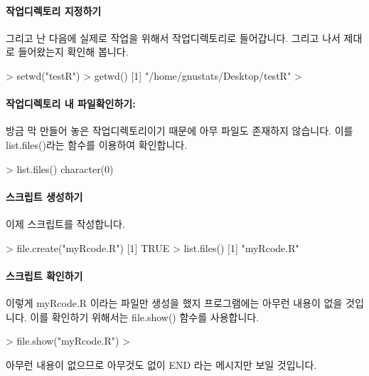 \documentclass[tutorial.tex]{subfiles}
\begin{document}
\paragraph{작업디렉토리 지정하기}
그리고 난 다음에 실제로 작업을 위해서 작업디렉토리로 들어갑니다. 
그리고 나서 제대로 들어왔는지 확인해 봅니다. 

\begin{Schunk}
\begin{Soutput}
> setwd("testR")
> getwd()
[1] "/home/gnustats/Desktop/testR"
>
\end{Soutput}
\end{Schunk}

\paragraph{작업디렉토리 내 파일확인하기:}
방금 막 만들어 놓은 작업디렉토리이기 때문에 아무 파일도 존재하지 않습니다. 
이를 list.files()라는 함수를 이용하여 확인합니다. 

\begin{Schunk}
\begin{Soutput}
> list.files()
character(0)
\end{Soutput}
\end{Schunk}

\paragraph{스크립트 생성하기}
이제 스크립트를 작성합니다. 
\begin{Schunk}
\begin{Soutput}
> file.create("myRcode.R")
[1] TRUE
> list.files()
[1] "myRcode.R"
\end{Soutput}
\end{Schunk}

\paragraph{스크립트 확인하기}
이렇게 myRcode.R 이라는 파일만 생성을 했지 프로그램에는 아무런 내용이 없을 것입니다. 
이를 확인하기 위해서는 file.show() 함수를 사용합니다. 

\begin{Schunk}
\begin{Soutput}
> file.show("myRcode.R")
>
\end{Soutput}
\end{Schunk}

아무런 내용이 없으므로 아무것도 없이 END 라는 메시지만 보일 것입니다.
\end{document}
